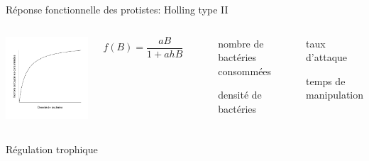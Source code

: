 \documentclass[11pt, compress, aspectratio=1610]{beamer}
\providecommand{\tightlist}{%
  \setlength{\itemsep}{0pt}\setlength{\parskip}{0pt}}
\newcommand{\begincols}{\begin{columns}}
\newcommand{\stopcols}{\end{columns}}
\begin{document}
\begin{frame}{Réponse fonctionnelle des protistes: Holling type II}

\begincols
  \centering
 \includegraphics[width=1\linewidth]{figuresAz/repfonc.pdf}

\hfill{} \[ f(B) = \dfrac{aB}{1+ahB}\]

~

\begin{description}
\tightlist
\item[\(f(B)\)]
nombre de bactéries consommées
\item[\(B\)]
densité de bactéries
\end{description}

~

\begin{description}
\tightlist
\item[a]
taux d'attaque
\item[h]
temps de manipulation
\end{description}

\stopcols

\end{frame}

\begin{frame}{Régulation trophique}

\centering
\par

\end{frame}
\end{document}
